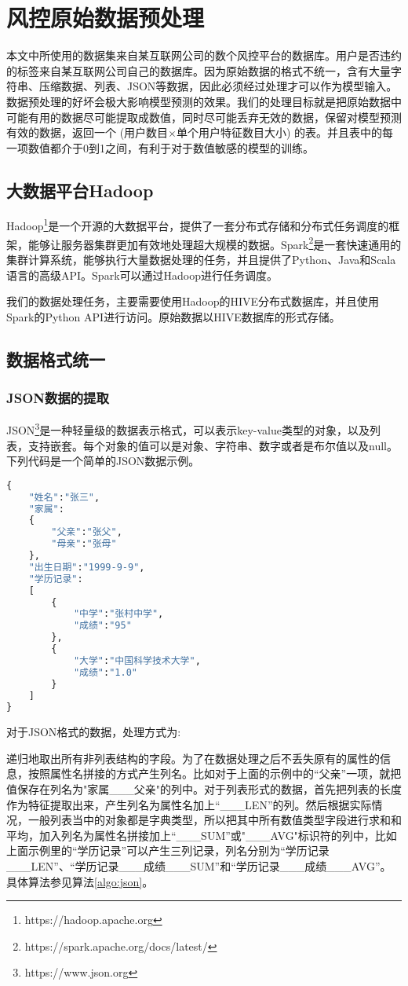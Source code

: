 \chapter{风控原始数据预处理}\label{data_refinement}
本文中所使用的数据集来自某互联网公司的数个风控平台的数据库。用户是否违约的标签来自某互联网公司自己的数据库。因为原始数据的格式不统一，含有大量字符串、压缩数据、列表、JSON等数据，因此必须经过处理才可以作为模型输入。数据预处理的好坏会极大影响模型预测的效果\cite{kotsiantis2006data}。我们的处理目标就是把原始数据中可能有用的数据尽可能提取成数值，同时尽可能丢弃无效的数据，保留对模型预测有效的数据，返回一个 (用户数目$\times$单个用户特征数目大小) 的表。并且表中的每一项数值都介于0到1之间，有利于对于数值敏感的模型的训练。
\section{大数据平台Hadoop}
Hadoop\footnote{https://hadoop.apache.org}是一个开源的大数据平台，提供了一套分布式存储和分布式任务调度的框架，能够让服务器集群更加有效地处理超大规模的数据。Spark\footnote{https://spark.apache.org/docs/latest/}是一套快速通用的集群计算系统，能够执行大量数据处理的任务，并且提供了Python、Java和Scala语言的高级API。Spark可以通过Hadoop进行任务调度。

我们的数据处理任务，主要需要使用Hadoop的HIVE分布式数据库，并且使用Spark的Python API进行访问。原始数据以HIVE数据库的形式存储。
\section{数据格式统一}
\subsection{JSON数据的提取}
JSON\footnote{https://www.json.org}是一种轻量级的数据表示格式，可以表示key-value类型的对象，以及列表，支持嵌套。每个对象的值可以是对象、字符串、数字或者是布尔值以及null。下列代码是一个简单的JSON数据示例。
\begin{lstlisting}[language=PYTHON, caption={JSON示例}, label={JSON示例}]
{
	"姓名":"张三",
	"家属": 
	{
		"父亲":"张父",
		"母亲":"张母"
	},
	"出生日期":"1999-9-9",
	"学历记录":
	[
		{
			"中学":"张村中学",
			"成绩":"95"
		},
		{
			"大学":"中国科学技术大学",
			"成绩":"1.0"
		}
	]
}
\end{lstlisting}

对于JSON格式的数据，处理方式为:

递归地取出所有非列表结构的字段。为了在数据处理之后不丢失原有的属性的信息，按照属性名拼接的方式产生列名。比如对于上面的示例中的“父亲”一项，就把值保存在列名为"家属\_\_\_父亲"的列中。对于列表形式的数据，首先把列表的长度作为特征提取出来，产生列名为属性名加上“\_\_\_LEN”的列。然后根据实际情况，一般列表当中的对象都是字典类型，所以把其中所有数值类型字段进行求和和平均，加入列名为属性名拼接加上“\_\_\_SUM”或"\_\_\_AVG"标识符的列中，比如上面示例里的“学历记录”可以产生三列记录，列名分别为“学历记录\_\_\_LEN”、“学历记录\_\_\_成绩\_\_\_SUM”和“学历记录\_\_\_成绩\_\_\_AVG”。具体算法参见算法\ref{algo:json}。

